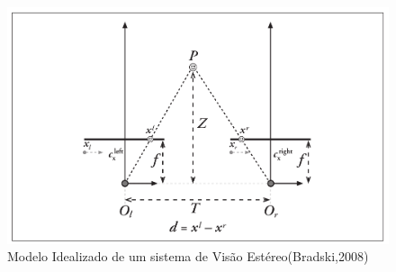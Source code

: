 \begin{figure}[H]
 	\centering
 	\includegraphics[scale=0.35]{./Resources/stereo_image_geometric_model.png}
 	\caption{Modelo Idealizado de um sistema de Visão Estéreo(Bradski,2008)}
 	\label{stereo_image_geometric_model}
\end{figure}

